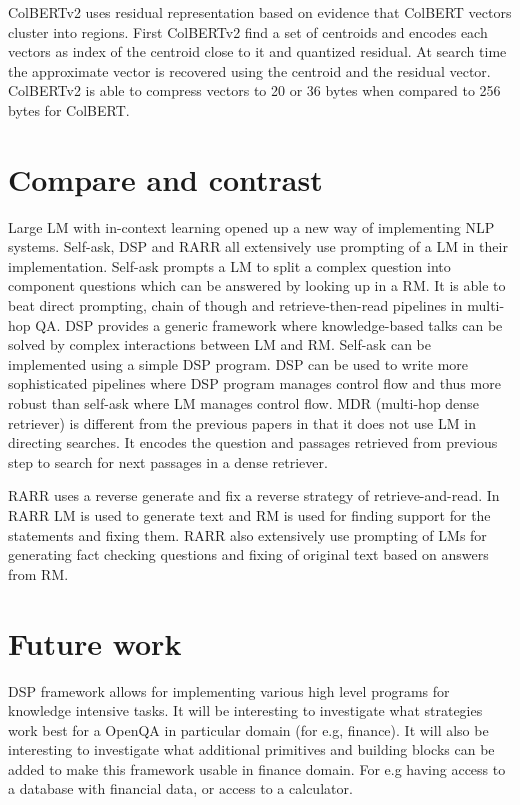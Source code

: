 \documentclass{article}
\begin{document}
ColBERTv2 uses residual representation based on evidence that ColBERT vectors cluster into regions. First ColBERTv2 find a set of centroids and encodes each vectors as index of the centroid close to it and quantized residual. At search time the approximate vector is recovered using the centroid and the residual vector. ColBERTv2 is able to compress vectors to 20 or 36 bytes when compared to 256 bytes for ColBERT. 

\section{Compare and contrast}
Large LM with in-context learning opened up a new way of implementing NLP systems. Self-ask, DSP and RARR all extensively use prompting of a LM in their implementation. Self-ask\cite{https://doi.org/10.48550/arxiv.2210.03350} prompts a LM to split a complex question into component questions which can be answered by looking up in a RM. It is able to beat direct prompting, chain of though and retrieve-then-read pipelines in multi-hop QA.
DSP\cite{https://doi.org/10.48550/arxiv.2212.14024} provides a generic framework where knowledge-based talks can be solved by complex interactions between LM and RM. Self-ask can be implemented using a simple DSP program. DSP can be used to write more sophisticated pipelines where DSP program manages control flow and thus more robust than self-ask where LM manages control flow. MDR (multi-hop dense retriever)\cite{https://doi.org/10.48550/arxiv.2009.12756} is different from the previous papers in that it does not use LM in directing searches. It encodes the question and passages retrieved from previous step to search for next passages in a dense retriever.    

RARR\cite{https://doi.org/10.48550/arxiv.2210.08726} uses a reverse generate and fix a reverse strategy of retrieve-and-read. In RARR LM is used to generate text and RM is used for finding support for the statements and fixing them. RARR also extensively use prompting of LMs for generating fact checking questions and fixing of original text based on answers from RM.

\section{Future work}
DSP framework allows for implementing various high level programs for knowledge intensive tasks. It will be interesting to investigate what strategies work best for a OpenQA in particular domain (for e.g, finance). It will also be interesting to investigate what additional primitives and building blocks can be added to make this framework usable in finance domain. For e.g having access to a database with financial data, or access to a calculator.    
\medskip

\printbibliography
\end{document}
